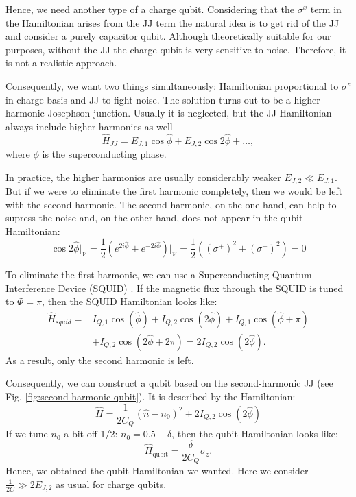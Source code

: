 \documentclass[reprint, aps, prx, amsmath, amssymb, longbibliography, superscriptaddress]{revtex4-2}
\begin{document}
Hence, we need another type of a charge qubit. Considering that the $\sigma^x$ term in the Hamiltonian arises from the JJ term the natural idea is to get rid of the JJ and consider a purely capacitor qubit. Although theoretically suitable for our purposes, without the JJ the charge qubit is very sensitive to noise. Therefore, it is not a realistic approach.

Consequently, we want two things simultaneously: Hamiltonian proportional to $\sigma^z$ in charge basis and JJ to fight noise. The solution turns out to be a higher harmonic Josephson junction. Usually it is neglected, but the JJ Hamiltonian always include higher harmonics as well
\begin{equation}
    \hat H_{JJ} = E_{J,1} \cos{\hat \phi} + E_{J,2} \cos{2\hat \phi} + \dots,
\end{equation}
where $\phi$ is the superconducting phase.

In practice, the higher harmonics are usually considerably weaker $E_{J,2} \ll E_{J,1}$. But if we were to eliminate the first harmonic completely, then we would be left with the second harmonic. The second harmonic, on the one hand, can help to supress the noise and, on the other hand, does not appear in the qubit Hamiltonian:
\begin{equation}
    \cos{2\hat \phi}\bigg|_{\mathcal{V}} = \frac{1}{2}\left(e^{2i\hat\phi} + e^{-2i\hat \phi}\right)\bigg|_{\mathcal{V}}=\frac{1}{2}\left((\sigma^+)^2 + (\sigma^-)^2\right) =0
\end{equation}

To eliminate the first harmonic, we can use a Superconducting Quantum Interference Device (SQUID) \cite{valentini_parityconserving_2024}. If the magnetic flux through the SQUID is tuned to $\Phi = \pi$, then the SQUID Hamiltonian looks like:
\begin{equation}
\begin{aligned}
    \hat H_{squid} = &I_{Q,1} \cos(\hat \phi) + I_{Q,2} \cos(2\hat \phi) + I_{Q,1} \cos(\hat \phi + \pi) \\
    &+ I_{Q,2} \cos(2\hat \phi + 2\pi) = 2 I_{Q,2} \cos(2\hat \phi).
\end{aligned}
\end{equation}
As a result, only the second harmonic is left.

Consequently, we can construct a qubit based on the second-harmonic JJ (see Fig. \ref{fig:second-harmonic-qubit}). It is described by the Hamiltonian:
\begin{equation}
\label{eq:second-harmonic-qubit}
    \hat H = \frac{1}{2C_Q} (\hat n - n_0)^2 + 2 I_{Q,2} \cos(2\hat\phi)
\end{equation}
If we tune $n_0$ a bit off 1/2: $n_0 = 0.5 - \delta$, then the qubit Hamiltonian looks like:
\begin{equation}
    \hat H_{\text{qubit}} = \frac{\delta}{2 C_Q} \sigma_z.
\end{equation}
Hence, we obtained the qubit Hamiltonian we wanted. Here we consider $\frac{1}{2C} \gg 2 E_{J,2}$ as usual for charge qubits.
\end{document}
